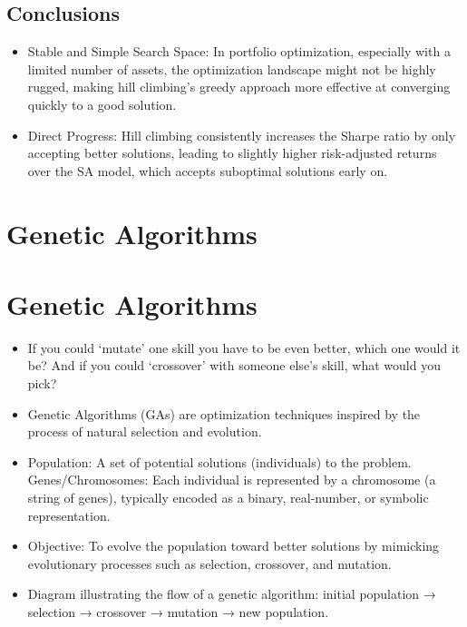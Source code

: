 \documentclass[
  letterpaper,
  DIV=11,
  numbers=noendperiod]{scrreprt}
\providecommand{\tightlist}{%
  \setlength{\itemsep}{0pt}\setlength{\parskip}{0pt}}\usepackage{longtable,booktabs,array}
\begin{document}
\section{Conclusions}\label{conclusions-4}

\begin{itemize}
\tightlist
\item
  Stable and Simple Search Space: In portfolio optimization, especially
  with a limited number of assets, the optimization landscape might not
  be highly rugged, making hill climbing's greedy approach more
  effective at converging quickly to a good solution.
\item
  Direct Progress: Hill climbing consistently increases the Sharpe ratio
  by only accepting better solutions, leading to slightly higher
  risk-adjusted returns over the SA model, which accepts suboptimal
  solutions early on.
\end{itemize}


\chapter{Genetic Algorithms}\label{genetic-algorithms}


\chapter{Genetic Algorithms}\label{genetic-algorithms-1}

\begin{itemize}
\item
  If you could `mutate' one skill you have to be even better, which one
  would it be? And if you could `crossover' with someone else's skill,
  what would you pick?
\item
  Genetic Algorithms (GAs) are optimization techniques inspired by the
  process of natural selection and evolution.
\item
  Population: A set of potential solutions (individuals) to the problem.
  Genes/Chromosomes: Each individual is represented by a chromosome (a
  string of genes), typically encoded as a binary, real-number, or
  symbolic representation.
\item
  Objective: To evolve the population toward better solutions by
  mimicking evolutionary processes such as selection, crossover, and
  mutation.
\item
  Diagram illustrating the flow of a genetic algorithm: initial
  population → selection → crossover → mutation → new population.
\end{itemize}
\end{document}
